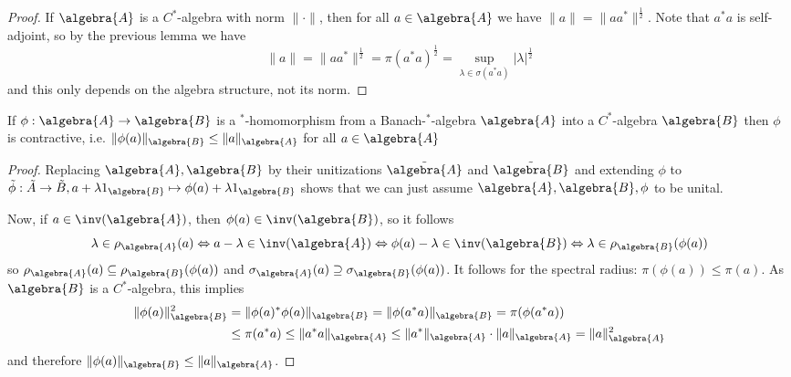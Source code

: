 \documentclass[a4paper]{article}
\begin{document}
\begin{proof}
	If $\algebra{A}$ is a $C^*$-algebra with norm $\| \cdot \|$, then for all $a \in \algebra{A}$ we have $\|a\| = \|a a^*\|^{\frac{1}{2}}$. Note that $a^*a$ is self-adjoint, so by the previous lemma we have
	\begin{equation*}
		\|a\| = \|a a^*\|^{\frac{1}{2}} = \pi(a^* a)^\frac{1}{2} = \sup_{\lambda \in \sigma(a^* a)} |\lambda|^{\frac{1}{2}}
	\end{equation*}
	and this only depends on the algebra structure, not its norm.
\end{proof}

\begin{corollary}
	If $\phi: \algebra{A} \to \algebra{B}$ is a $^*$-homomorphism from a Banach-$^*$-algebra $\algebra{A}$ into a $C^*$-algebra $\algebra{B}$ then $\phi$ is contractive, i.e. $\|\phi(a)\|_\algebra{B} \leq \|a\|_\algebra{A}$ for all $a \in \algebra{A}$
\end{corollary}

\begin{proof}
	Replacing $\algebra{A}, \algebra{B}$ by their unitizations $\tilde{\algebra{A}}$ and $\tilde{\algebra{B}}$ and extending $\phi$ to $\tilde{\phi}: \tilde{A} \to \tilde{B}, a + \lambda 1_\algebra{B} \mapsto \phi(a) + \lambda 1_\algebra{B}$ shows that we can just assume $\algebra{A}, \algebra{B}, \phi$ to be unital.
	
	Now, if $a \in \inv(\algebra{A})$, then $\phi(a) \in \inv(\algebra{B})$, so it follows
	\begin{equation*}
		\lambda \in \rho_\algebra{A}(a) \iff a - \lambda \in \inv(\algebra{A}) \iff \phi(a) - \lambda \in \inv(\algebra{B}) \iff \lambda \in \rho_\algebra{B}(\phi(a))
	\end{equation*}
	so $\rho_\algebra{A}(a) \subseteq \rho_\algebra{B}(\phi(a))$ and $\sigma_\algebra{A}(a) \supseteq \sigma_\algebra{B}(\phi(a))$.
	It follows for the spectral radius: $\pi(\phi(a)) \leq \pi(a)$.
	As $\algebra{B}$ is a $C^*$-algebra, this implies
	\begin{align*}
		\|\phi(a)\|_\algebra{B}^2 &= \|\phi(a)^* \phi(a)\|_\algebra{B} = \|\phi(a^*a)\|_\algebra{B} = \pi(\phi(a^* a)) \\ &\leq \pi(a^* a) \leq \|a^* a\|_\algebra{A} \leq \|a^*\|_\algebra{A} \cdot \|a\|_\algebra{A} = \|a\|_\algebra{A}^2
	\end{align*}
	and therefore $\|\phi(a)\|_\algebra{B} \leq \|a\|_\algebra{A}$.
\end{proof}
\end{document}
